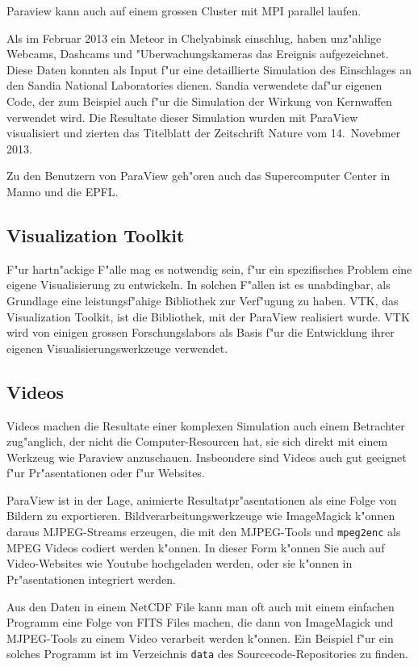 Paraview kann auch auf einem grossen Cluster mit MPI parallel laufen.

Als im Februar 2013 ein Meteor in Chelyabinsk einschlug, haben unz"ahlige
Webcams, Dashcams und "Uberwachungskameras das Ereignis aufgezeichnet.
Diese Daten konnten als Input f"ur eine detaillierte Simulation
des Einschlages an den Sandia National Laboratories dienen.
Sandia verwendete daf"ur eigenen Code, der zum Beispiel auch f"ur 
die Simulation der Wirkung von Kernwaffen verwendet wird.
Die Resultate dieser Simulation wurden mit ParaView visualisiert
und zierten das Titelblatt der Zeitschrift Nature vom 14.~Novebmer 2013.

Zu den Benutzern von ParaView geh"oren auch das Supercomputer Center 
in Manno und die EPFL. 

\subsection{Visualization Toolkit}
F"ur hartn"ackige F"alle mag es notwendig sein, f"ur ein spezifisches
Problem eine eigene Visualisierung zu entwickeln.
In solchen F"allen ist es unabdingbar, als Grundlage eine leistungsf"ahige
Bibliothek zur Verf"ugung zu haben. 
VTK, das Visualization Toolkit, ist die Bibliothek, mit der ParaView
realisiert wurde.
VTK wird von einigen grossen Forschungslabors als Basis f"ur die
Entwicklung ihrer eigenen Visualisierungswerkzeuge verwendet.

\subsection{Videos}
Videos machen die Resultate einer komplexen Simulation auch einem
Betrachter zug"anglich, der nicht die Computer-Resourcen hat, sie sich
direkt mit einem Werkzeug wie Paraview anzuschauen. Insbeondere  sind
Videos auch gut geeignet f"ur Pr"asentationen oder f"ur Websites.

ParaView ist in der Lage, animierte Resultatpr"asentationen als eine 
Folge von Bildern zu exportieren. Bildverarbeitungswerkzeuge wie
ImageMagick k"onnen daraus MJPEG-Streams erzeugen, die mit den
MJPEG-Tools und {\tt mpeg2enc} als MPEG Videos codiert werden k"onnen.
In dieser Form k"onnen Sie auch auf Video-Websites wie Youtube hochgeladen
werden, oder sie k"onnen in Pr"asentationen integriert werden.

Aus den Daten in einem NetCDF File kann man oft auch mit einem
einfachen Programm eine Folge von FITS Files machen, die dann von ImageMagick
und MJPEG-Tools zu einem Video verarbeit werden k"onnen.
Ein Beispiel f"ur ein solches Programm ist im Verzeichnis 
\texttt{data}
des Sourcecode-Repositories zu finden.

